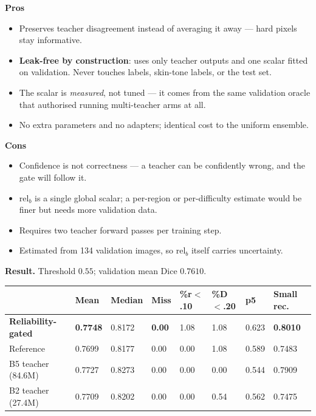 \documentclass[11pt]{article}
\newcommand{\win}[1]{\textcolor{wingreen}{\textbf{#1}}}
\newcommand{\pro}[1]{\item[\textcolor{proscol}{$+$}] #1}
\newcommand{\con}[1]{\item[\textcolor{conscol}{$-$}] #1}
\begin{document}
\begin{minipage}[t]{0.475\textwidth}
\textbf{\textcolor{proscol}{Pros}}
\begin{itemize}[leftmargin=1.5em,itemsep=1pt,label={},labelwidth=1em,labelsep=0.4em,align=left]
  \pro{Preserves teacher disagreement instead of averaging it away --- hard pixels stay
       informative.}
  \pro{\textbf{Leak-free by construction}: uses only teacher outputs and one scalar fitted on
       validation. Never touches labels, skin-tone labels, or the test set.}
  \pro{The scalar is \emph{measured}, not tuned --- it comes from the same validation oracle that
       authorised running multi-teacher arms at all.}
  \pro{No extra parameters and no adapters; identical cost to the uniform ensemble.}
\end{itemize}
\end{minipage}\hfill%
\begin{minipage}[t]{0.475\textwidth}
\textbf{\textcolor{conscol}{Cons}}
\begin{itemize}[leftmargin=1.5em,itemsep=1pt,label={},labelwidth=1em,labelsep=0.4em,align=left]
  \con{Confidence is not correctness --- a teacher can be confidently wrong, and the gate will
       follow it.}
  \con{$\mathrm{rel}_b$ is a single global scalar; a per-region or per-difficulty estimate would
       be finer but needs more validation data.}
  \con{Requires two teacher forward passes per training step.}
  \con{Estimated from 134 validation images, so $\mathrm{rel}_b$ itself carries uncertainty.}
\end{itemize}
\end{minipage}

\vspace{6pt}
\textbf{Result.} Threshold $0.55$; validation mean Dice $0.7610$.

\begin{center}\small
\begin{tabular}{K q q q q q q M}
\toprule
& \textbf{Mean} & \textbf{Median} & \textbf{Miss} & \textbf{\%r$<$.10} & \textbf{\%D$<$.20} &
\textbf{p5} & \textbf{Small rec.} \\
\midrule
\win{Reliability-gated} & \win{0.7748} & 0.8172 & \textbf{0.00} & 1.08 & 1.08 & 0.623 &
  \win{0.8010} \\
Reference               & 0.7699 & 0.8177 & 0.00 & 0.00 & 1.08 & 0.589 & 0.7483 \\
B5 teacher (84.6M)      & 0.7727 & 0.8273 & 0.00 & 0.00 & 0.00 & 0.544 & 0.7909 \\
B2 teacher (27.4M)      & 0.7709 & 0.8202 & 0.00 & 0.00 & 0.54 & 0.562 & 0.7475 \\
\bottomrule
\end{tabular}
\end{center}
\end{document}
